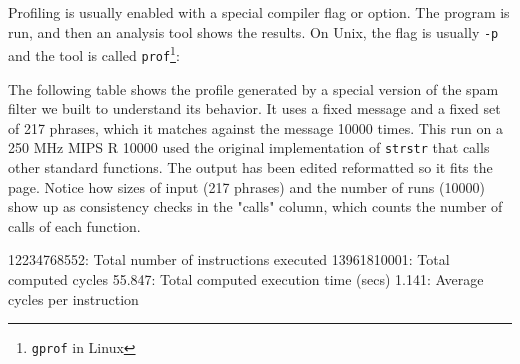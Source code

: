 Profiling is usually enabled with a special compiler flag or option. The
program is run, and then an analysis tool shows the results. On Unix, the
flag is usually \verb'-p' and the tool is called
\verb"prof"\footnote{\texttt{gprof} in Linux}:
\begin{wellcode}
\end{wellcode}
The following table shows the profile generated by a special version of the
spam filter we built to understand its behavior. It uses a fixed message
and a fixed set of 217 phrases, which it matches against the message
10000 times. This run on a 250 MHz MIPS R 10000 used the original
implementation of \verb'strstr' that calls other standard functions. The
output has been edited reformatted so it fits the page. Notice how sizes of
input (217 phrases) and the number of runs (10000) show up as consistency
checks in the "calls" column, which counts the number of calls of each
function.
\begin{wellcode}
    12234768552: Total number of instructions executed
    13961810001: Total computed cycles
    55.847: Total computed execution time (secs)
    1.141: Average cycles per instruction
\end{wellcode}

